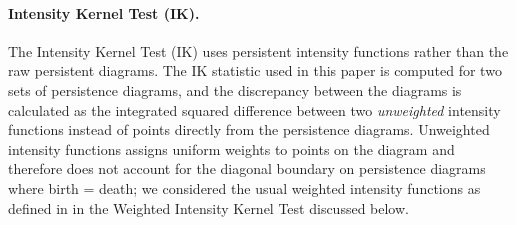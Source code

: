 \documentclass[12pt]{article}
\begin{document}
%
%
%

\paragraph{Intensity Kernel Test (IK).}
The Intensity Kernel Test (IK) uses persistent intensity functions rather than the raw persistent diagrams.
The IK statistic used in this paper is computed for two sets of persistence diagrams, and the discrepancy between the diagrams is calculated as the integrated squared difference between two \emph{unweighted} intensity functions instead of points directly from the persistence diagrams. Unweighted intensity functions assigns uniform weights to points on the diagram and therefore does not account for the diagonal boundary on persistence diagrams where birth = death; we considered the usual weighted intensity functions as defined in \cite{chen2015statistical} in the Weighted Intensity Kernel Test discussed below.
\end{document}
